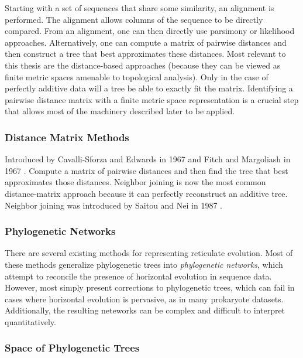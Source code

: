 Starting with a set of sequences that share some similarity, an alignment is performed.
The alignment allows columns of the sequence to be directly compared.
From an alignment, one can then directly use parsimony or likelihood approaches.
Alternatively, one can compute a matrix of pairwise distances and then construct a tree that best approximates these distances.
Most relevant to this thesis are the distance-based approaches (because they can be viewed as finite metric spaces amenable to topological analysis).
Only in the case of perfectly additive data will a tree be able to exactly fit the matrix.
Identifying a pairwise distance matrix with a finite metric space representation is a crucial step that allows most of the machinery described later to be applied.

\subsubsection{Distance Matrix Methods}

Introduced by Cavalli-Sforza and Edwards in 1967 \cite{CavalliSforza:1967th} and Fitch and Margoliash in 1967 \cite{Fitch:1967we}.
Compute a matrix of pairwise distances and then find the tree that best approximates those distances.
Neighbor joining is now the most common distance-matrix approach because it can perfectly reconstruct an additive tree.
Neighbor joining was introduced by Saitou and Nei in 1987 \cite{Saitou:1987wo}.

\subsubsection{Phylogenetic Networks}

There are several existing methods for representing reticulate evolution.
Most of these methods generalize phylogenetic trees into \emph{phylogenetic networks}, which attempt to reconcile the presence of horizontal evolution in sequence data.
However, most simply present corrections to phylogenetic trees, which can fail in cases where horizontal evolution is pervasive, as in many prokaryote datasets.
Additionally, the resulting neteworks can be complex and difficult to interpret quantitatively.
\kje{[Expand.]}

\subsubsection{Space of Phylogenetic Trees}


